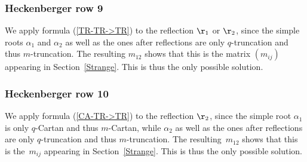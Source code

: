 \documentclass[10pt,a4paper]{amsart}
\numberwithin{equation}{section}
\begin{document}
\subsubsection*{Heckenberger row 9}
We apply formula (\ref{TR-TR->TR}) to the reflection $\r_1$ or $\r_2$, since the simple roots $\alpha_1$ and $\alpha_2$ as well as the ones after reflections are only $q$-truncation and thus $m$-truncation. The resulting $m_{12}$ shows that this is the matrix $(m_{ij})$ appearing in Section~\ref{Strange}. This is thus the only possible solution.

\subsubsection*{Heckenberger row 10}
We apply formula (\ref{CA-TR->TR}) to the reflection $\r_{2}$, since the simple root $\alpha_1$ is only $q$-Cartan and thus $m$-Cartan, while $\alpha_2$ as well as the ones after reflections are only $q$-truncation and thus $m$-truncation. The resulting~$m_{12}$ shows that this is the~$m_{ij}$ appearing in Section~\ref{Strange}. This is thus the only possible solution.
\end{document}
